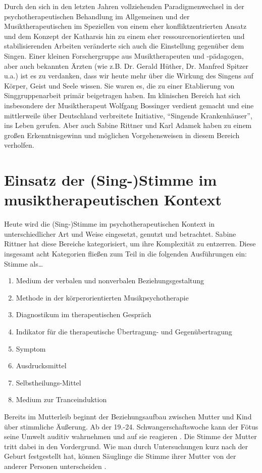 Durch den sich in den letzten Jahren vollziehenden Paradigmenwechsel in der psychotherapeutischen Behandlung im Allgemeinen und der Musiktherapeutischen im Speziellen von einem eher konfliktzentrierten Ansatz und dem Konzept der Katharsis hin zu einem eher ressourcenorientierten und stabilisierenden Arbeiten veränderte sich auch die Einstellung gegenüber dem Singen\autocite[vgl.][11]{wolf2012}. Einer kleinen Forschergruppe aus Musiktherapeuten und -pädagogen, aber auch bekannten Ärzten (wie z.B. Dr. Gerald Hüther, Dr. Manfred Spitzer u.a.) ist es zu verdanken, dass wir heute mehr über die Wirkung des Singens auf Körper, Geist und Seele wissen. Sie waren es, die zu einer Etablierung von Singgruppenarbeit primär beigetragen haben. Im klinischen Bereich hat sich insbesondere der Musiktherapeut Wolfgang Bossinger verdient gemacht und eine mittlerweile über Deutschland verbreitete Initiative, "`Singende Krankenhäuser"', ins Leben gerufen. Aber auch Sabine Rittner und Karl Adamek haben zu einem großen Erkenntnisgewinn und möglichen Vorgehensweisen in diesem Bereich verholfen.

\section{Einsatz der (Sing-)Stimme im musiktherapeutischen Kontext}

Heute wird die (Sing-)Stimme im psychotherapeutischen Kontext in unterschiedlicher Art und Weise eingesetzt, genutzt und betrachtet. Sabine Rittner \autocite[vgl.][204 ff.]{rittner2008} hat diese Bereiche kategorisiert, um ihre Komplexität zu entzerren. Diese insgesamt acht Kategorien fließen zum Teil in die folgenden Ausführungen ein: 
Stimme als\ldots
\begin{enumerate}
\item Medium der verbalen und nonverbalen Beziehungsgestaltung
\item Methode in der körperorientierten Musikpsychotherapie
\item Diagnostikum im therapeutischen Gespräch
\item Indikator für die therapeutische Übertragung- und Gegenübertragung
\item Symptom
\item Ausdrucksmittel
\item Selbstheilungs-Mittel
\item Medium zur Tranceinduktion
\end{enumerate}

Bereits im Mutterleib beginnt der Beziehungsaufbau zwischen Mutter und Kind über stimmliche Äußerung. Ab der 19.-24. Schwangerschaftswoche kann der Fötus seine Umwelt auditiv wahrnehmen und auf sie reagieren \autocite[vgl.][110]{deckervoigt2008}. Die Stimme der Mutter tritt dabei in den Vordergrund. Wie man durch Untersuchungen kurz nach der Geburt festgestellt hat, können Säuglinge die Stimme ihrer Mutter von der anderer Personen unterscheiden \autocite [vgl.][22f]{noecker-ribeaupierre2004}. 

